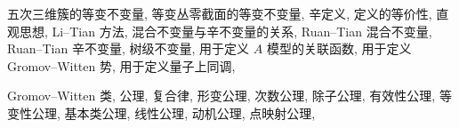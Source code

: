 \begin{theindex}
\subsubitem \leavevmode\hypertarget{idx:0539}{五次三维簇的等变不变量},\enspace{}
\subsubitem \leavevmode\hypertarget{idx:0540}{等变丛零截面的等变不变量},\enspace{}
\subitem \leavevmode\hypertarget{idx:0541}{辛定义},\enspace{}
\subsubitem \leavevmode\hypertarget{idx:0542}{定义的等价性},\enspace{}
\subsubitem \leavevmode\hypertarget{idx:0543}{直观思想},\enspace{}
\subsubitem \leavevmode\hypertarget{idx:0544}{Li--Tian 方法},\enspace{}
\subsubitem \leavevmode\hypertarget{idx:0545}{混合不变量与辛不变量的关系},\enspace{}
\subsubitem \leavevmode\hypertarget{idx:0546}{Ruan--Tian 混合不变量},\enspace{}
\subsubitem \leavevmode\hypertarget{idx:0547}{Ruan--Tian 辛不变量},\enspace{}
\subitem \leavevmode\hypertarget{idx:0548}{树级不变量},\enspace{}
\subitem \leavevmode\hypertarget{idx:0549}{用于定义 $A$ 模型的关联函数},\enspace{}
\subitem \leavevmode\hypertarget{idx:0550}{用于定义 Gromov--Witten 势},\enspace{}
\subitem \leavevmode\hypertarget{idx:0551}{用于定义量子上同调},\enspace{}
\indexspace
\item \leavevmode\hypertarget{idx:0494}{Gromov--Witten 类},\enspace{}
\subitem \leavevmode\hypertarget{idx:0495}{公理},\enspace{}
\subsubitem \leavevmode\hypertarget{idx:0496}{复合律},\enspace{}
\subsubitem \leavevmode\hypertarget{idx:0497}{形变公理},\enspace{}
\subsubitem \leavevmode\hypertarget{idx:0498}{次数公理},\enspace{}
\subsubitem \leavevmode\hypertarget{idx:0499}{除子公理},\enspace{}
\subsubitem \leavevmode\hypertarget{idx:0500}{有效性公理},\enspace{}
\subsubitem \leavevmode\hypertarget{idx:0501}{等变性公理},\enspace{}
\subsubitem \leavevmode\hypertarget{idx:0502}{基本类公理},\enspace{}
\subsubitem \leavevmode\hypertarget{idx:0503}{线性公理},\enspace{}
\subsubitem \leavevmode\hypertarget{idx:0504}{动机公理},\enspace{}
\subsubitem \leavevmode\hypertarget{idx:0505}{点映射公理},\enspace{}

\end{theindex}
